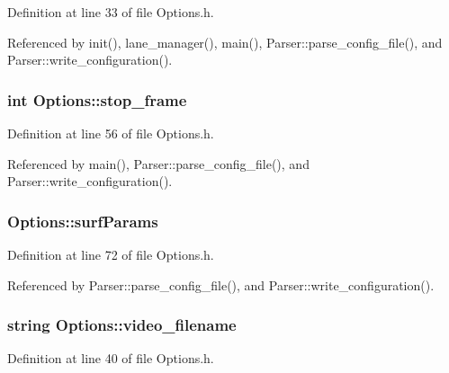 \-Definition at line 33 of file \-Options.\-h.



\-Referenced by init(), lane\-\_\-manager(), main(), \-Parser\-::parse\-\_\-config\-\_\-file(), and \-Parser\-::write\-\_\-configuration().

\hypertarget{class_options_a45c792c3812d45288b199e7eb8f74400}{
\subsubsection[{stop\-\_\-frame}]{\setlength{\rightskip}{0pt plus 5cm}int {\bf \-Options\-::stop\-\_\-frame}}}
\label{class_options_a45c792c3812d45288b199e7eb8f74400}


\-Definition at line 56 of file \-Options.\-h.



\-Referenced by main(), \-Parser\-::parse\-\_\-config\-\_\-file(), and \-Parser\-::write\-\_\-configuration().

\hypertarget{class_options_ad1d83ecaa7c69b9b49e949c4c2f7077a}{
\subsubsection[{surf\-Params}]{ {\bf \-Options\-::surf\-Params}}}
\label{class_options_ad1d83ecaa7c69b9b49e949c4c2f7077a}


\-Definition at line 72 of file \-Options.\-h.



\-Referenced by \-Parser\-::parse\-\_\-config\-\_\-file(), and \-Parser\-::write\-\_\-configuration().

\hypertarget{class_options_a9bae124c8f4d7fff8bb26d319967671e}{
\subsubsection[{video\-\_\-filename}]{\setlength{\rightskip}{0pt plus 5cm}string {\bf \-Options\-::video\-\_\-filename}}}
\label{class_options_a9bae124c8f4d7fff8bb26d319967671e}


\-Definition at line 40 of file \-Options.\-h.




